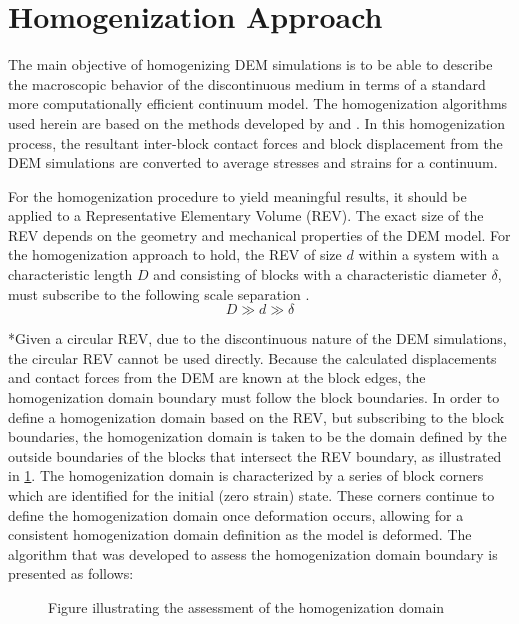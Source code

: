 \section{Homogenization Approach}

The main objective of homogenizing DEM simulations is to be able to
describe the macroscopic behavior of the discontinuous medium in terms
of a standard more computationally efficient continuum model. The
homogenization algorithms used herein are based on the methods developed
by \citet{daddetta_particle_2004} and \citet{wellmann_homogenization_2008}. In this
homogenization process, the resultant inter-block contact forces and
block displacement from the DEM simulations are converted to average
stresses and strains for a continuum.

For the homogenization procedure to yield meaningful results, it should
be applied to a Representative Elementary Volume (REV). The exact size of the REV depends on the geometry
and mechanical properties of the DEM model. For the homogenization
approach to hold, the REV of size $d$ within a system with a characteristic
length $D$ and consisting of blocks with a characteristic diameter
$\delta$, must subscribe to the following scale separation \cite{wellmann_homogenization_2008}. 
\begin{equation}
D\gg d\gg\delta\label{eqn:hom1a}
\end{equation}



{*}Given a circular REV, due to the discontinuous nature of the DEM
simulations, the circular REV cannot be used directly. Because the
calculated displacements and contact forces from the DEM are known
at the block edges, the homogenization domain boundary must follow
the block boundaries. In order to define a homogenization domain based
on the REV, but subscribing to the block boundaries, the homogenization
domain is taken to be the domain defined by the outside boundaries
of the blocks that intersect the REV boundary, as illustrated in \ref{fig:vorDFN}.
The homogenization domain is characterized by a series of block corners
which are identified for the initial (zero strain) state. These corners
continue to define the homogenization domain once deformation occurs,
allowing for a consistent homogenization domain definition as the
model is deformed. The algorithm that was developed to assess the
homogenization domain boundary is presented as follows: 
\begin{figure}
\label{fig:vorDFN} \caption{Figure illustrating the assessment of the homogenization domain}
\end{figure}

